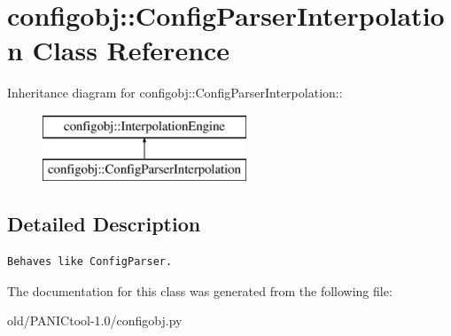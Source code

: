 \section{configobj::Config\-Parser\-Interpolation Class Reference}
\label{classconfigobj_1_1ConfigParserInterpolation}
Inheritance diagram for configobj::Config\-Parser\-Interpolation::\begin{figure}[H]
\begin{center}
\leavevmode
\includegraphics[height=2cm]{classconfigobj_1_1ConfigParserInterpolation}
\end{center}
\end{figure}


\subsection{Detailed Description}


\footnotesize\begin{verbatim}Behaves like ConfigParser.\end{verbatim}
\normalsize
 



The documentation for this class was generated from the following file:\begin{CompactItemize}
\item 
old/PANICtool-1.0/configobj.py\end{CompactItemize}
